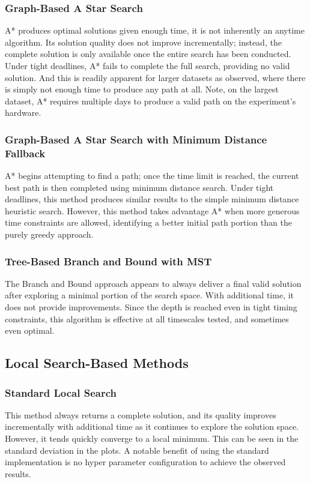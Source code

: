 \documentclass[11pt]{article}
\begin{document}
	\subsubsection{Graph-Based A Star Search}
	A* produces optimal solutions given enough time, it is not inherently an anytime algorithm. Its solution quality does not improve incrementally; instead, the complete solution is only available once the entire search has been conducted. Under tight deadlines, A* fails to complete the full search, providing no valid solution. And this is readily apparent for larger datasets as observed, where there is simply not enough time to produce any path at all. Note, on the largest dataset, A* requires multiple days to produce a valid path on the experiment's hardware.
	
	\subsubsection{Graph-Based A Star Search with Minimum Distance Fallback}
	A* begins attempting to find a path; once the time limit is reached, the current best path is then completed using minimum distance search. Under tight deadlines, this method produces similar results to the simple minimum distance heuristic search. However, this method takes advantage A* when more generous time constraints are allowed, identifying a better initial path portion than the purely greedy approach.
	
	\subsubsection{Tree-Based Branch and Bound with MST} 
	The Branch and Bound approach appears to always deliver a final valid solution after exploring a minimal portion of the search space. With additional time, it does not provide improvements. Since the depth is reached even in tight timing constraints, this algorithm is effective at all timescales tested, and sometimes even optimal.
	
	\subsection{Local Search-Based Methods}
	\subsubsection{Standard Local Search}
	This method always returns a complete solution, and its quality improves incrementally with additional time as it continues to explore the solution space. However, it tends quickly converge to a local minimum. This can be seen in the standard deviation in the plots. A notable benefit of using the standard implementation is no hyper parameter configuration to achieve the observed results. 
	
\end{document}
